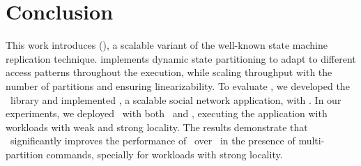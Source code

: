 \section{Conclusion}
\label{sec:conclusion}

This work introduces \dssmrlong{} (\dssmr), a scalable variant of the well-known state machine replication technique. 
\dssmr{} implements dynamic state partitioning to adapt to different access patterns throughout the execution, while scaling throughput with the number of partitions and ensuring linearizability.
To evaluate \dssmr{}, we developed the \libname\ library and implemented \appname{}, a scalable social network application, with \libname{}.
In our experiments, we deployed \appname\ with both \dssmr\ and \ssmr{}, executing the application with workloads with weak and strong locality.
The results demonstrate that \dssmr\ significantly improves the performance of \appname\ over \ssmr\ in the presence of multi-partition commands, specially for workloads with strong locality.